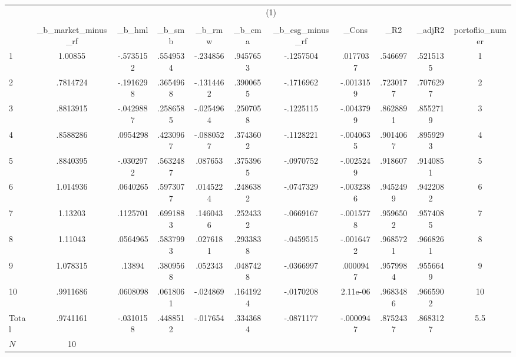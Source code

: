 {
\def\sym#1{\ifmmode^{#1}\else\(^{#1}\)\fi}
\begin{tabular}{l*{1}{cccccccccc}}
\hline\hline
            &\multicolumn{10}{c}{(1)}                                                                                                         \\
            &\multicolumn{10}{c}{}                                                                                                            \\
            &\_b\_market\_minus\_rf&      \_b\_hml&      \_b\_smb&      \_b\_rmw&      \_b\_cma&\_b\_esg\_minus\_rf&       \_Cons&         \_R2&      \_adjR2&portoflio\_numer\\
\hline
1           &     1.00855&   -.5735152&    .5549534&    -.234856&    .9457653&   -.1257504&    .0177037&     .546697&    .5215135&           1\\
2           &    .7814724&   -.1916298&    .3654968&   -.1314462&    .3900655&   -.1716962&   -.0013159&    .7230177&    .7076297&           2\\
3           &    .8813915&   -.0429887&    .2586585&   -.0254964&    .2507058&   -.1225115&   -.0043799&    .8628891&    .8552719&           3\\
4           &    .8588286&    .0954298&    .4230967&   -.0880527&    .3743602&   -.1128221&   -.0040635&    .9014067&    .8959293&           4\\
5           &    .8840395&   -.0302972&    .5632487&     .087653&    .3753965&   -.0970752&   -.0025249&     .918607&    .9140851&           5\\
6           &    1.014936&    .0640265&    .5973077&    .0145224&    .2486382&   -.0747329&   -.0032386&    .9452499&    .9422082&           6\\
7           &     1.13203&    .1125701&    .6991883&    .1460436&    .2524332&   -.0669167&   -.0015778&    .9596502&    .9574085&           7\\
8           &     1.11043&    .0564965&    .5837993&    .0276181&    .2933838&   -.0459515&   -.0016472&    .9685721&    .9668261&           8\\
9           &    1.078315&      .13894&    .3809568&     .052343&    .0487428&   -.0366997&    .0000947&    .9579984&    .9556649&           9\\
10          &    .9911686&    .0608098&    .0618061&    -.024869&    .1641924&   -.0170208&    2.11e-06&    .9683486&    .9665902&          10\\
Total       &    .9741161&   -.0310158&    .4488512&    -.017654&    .3343684&   -.0871177&   -.0000947&    .8752437&    .8683127&         5.5\\
\hline
\(N\)       &          10&            &            &            &            &            &            &            &            &            \\
\hline\hline
\end{tabular}
}
